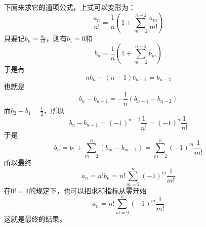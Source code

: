 下面来求它的通项公式，上式可以变形为：
\begin{equation}
  \label{recursive-equation-derangement-2}
  \frac{a_n}{n!}=\frac{1}{n}(1+\sum_{m=2}^{n-2}\frac{a_m}{m!})
\end{equation}
只要记$b_n=\frac{a_n}{n!}$，则有$b_1=0$和
\begin{equation}
  \label{eq:recursive-equation-derangement-simple}
  b_n=\frac{1}{n}(1+\sum_{m=2}^{n-2}b_m)
\end{equation}
于是有
\begin{equation}
  \label{eq:recursive-equation-derangement-simple-diff}
  nb_n-(n-1)b_{n-1}=b_{n-2}
\end{equation}
也就是
\begin{equation}
  \label{eq:recursive-equation-derangement-simple-diff2}
  b_n-b_{n-1}=-\frac{1}{n}(b_{n-1}-b_{n-2})
\end{equation}
而$b_2-b_1=\frac{1}{2}$，所以
\begin{equation}
  \label{eq:recursive-equation-derangement-bn}
  b_n-b_{n-1}=(-1)^{n-2}\frac{1}{n!}=(-1)^n\frac{1}{n!}
\end{equation}
于是
\begin{equation}
  \label{eq:derangement-bn}
  b_n=b_1+\sum_{m=2}^{n}(b_m-b_{m-1})=\sum_{m=2}^n(-1)^m\frac{1}{m!}
\end{equation}
所以最终
\begin{equation}
  \label{eq:derangement-an}
  a_n=n!b_n=n!\sum_{m=2}^n(-1)^m\frac{1}{m!}
\end{equation}
在$0!=1$的规定下，也可以把求和指标从零开始
\begin{equation}
  \label{eq:derangement-an2}
  a_n=n!\sum_{m=0}^n(-1)^m\frac{1}{m!}
\end{equation}
这就是最终的结果。

